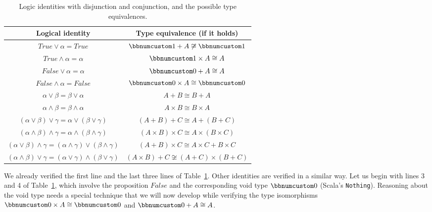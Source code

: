 \begin{table}
\begin{centering}
\begin{tabular}{|c|c|}
\hline 
\textbf{\small{}Logical identity} & \textbf{\small{}Type equivalence (if it holds)}\tabularnewline
\hline 
\hline 
{\small{}$True\vee\alpha=True$} & {\small{}$\bbnum 1+A\not\cong\bbnum 1$}\tabularnewline
\hline 
{\small{}$True\wedge\alpha=\alpha$} & {\small{}$\bbnum 1\times A\cong A$}\tabularnewline
\hline 
{\small{}$False\vee\alpha=\alpha$} & {\small{}$\bbnum 0+A\cong A$}\tabularnewline
\hline 
{\small{}$False\wedge\alpha=False$} & {\small{}$\bbnum 0\times A\cong\bbnum 0$}\tabularnewline
\hline 
{\small{}$\alpha\vee\beta=\beta\vee\alpha$} & {\small{}$A+B\cong B+A$}\tabularnewline
\hline 
{\small{}$\alpha\wedge\beta=\beta\wedge\alpha$} & {\small{}$A\times B\cong B\times A$}\tabularnewline
\hline 
{\small{}$\left(\alpha\vee\beta\right)\vee\gamma=\alpha\vee\left(\beta\vee\gamma\right)$} & {\small{}$\left(A+B\right)+C\cong A+\left(B+C\right)$}\tabularnewline
\hline 
{\small{}$\left(\alpha\wedge\beta\right)\wedge\gamma=\alpha\wedge\left(\beta\wedge\gamma\right)$} & {\small{}$\left(A\times B\right)\times C\cong A\times\left(B\times C\right)$}\tabularnewline
\hline 
{\small{}$\left(\alpha\vee\beta\right)\wedge\gamma=\left(\alpha\wedge\gamma\right)\vee\left(\beta\wedge\gamma\right)$} & {\small{}$\left(A+B\right)\times C\cong A\times C+B\times C$}\tabularnewline
\hline 
{\small{}$\left(\alpha\wedge\beta\right)\vee\gamma=\left(\alpha\vee\gamma\right)\wedge\left(\beta\vee\gamma\right)$} & {\small{}$\left(A\times B\right)+C\not\cong\left(A+C\right)\times\left(B+C\right)$}\tabularnewline
\hline 
\end{tabular}
\par\end{centering}
\caption{Logic identities with disjunction and conjunction, and the possible
type equivalences.\label{tab:Logical-identities-with-disjunction-and-conjunction}}
\end{table}

We already verified the first line and the last three lines of Table~\ref{tab:Logical-identities-with-disjunction-and-conjunction}.
Other identities are verified in a similar way. Let us begin with
lines 3 and 4 of Table~\ref{tab:Logical-identities-with-disjunction-and-conjunction},
which involve the proposition $False$ and the corresponding void
type $\bbnum 0$ (Scala\textsf{'}s \lstinline!Nothing!). Reasoning about the
void type needs a special technique that we will now develop while
verifying the type isomorphisms $\bbnum 0\times A\cong\bbnum 0$ and
$\bbnum 0+A\cong A$.

